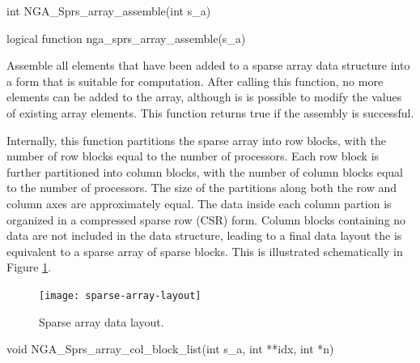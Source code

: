 \documentclass[12pt]{article}
\begin{document}
\begin{capi}
\begin{ccode}
int NGA_Sprs_array_assemble(int s_a)
\end{ccode}
\begin{funcargs}
\end{funcargs}
\end{capi}

\begin{fapi}
\begin{fcode}
logical function nga_sprs_array_assemble(s_a)
\end{fcode}
\end{fapi}

\gcoll

\begin{desc}
Assemble all elements that have been added to a sparse array data structure into
a form that is suitable for computation. After calling this function, no more
elements can be added to the array, although is is possible to modify the values
of existing array elements.  This function returns true if the assembly is
successful.

Internally, this function partitions the sparse array into row blocks, with the
number of row blocks equal to the number of processors. Each row block is
further partitioned into column blocks, with the number of column blocks
equal to the number of processors. The size of the partitions along both the row
and column axes are approximately equal. The data inside each column partion is
organized in a compressed sparse row (CSR) form. Column blocks containing no
data are not included in the data structure, leading to a final data layout the
is equivalent to a sparse array of sparse blocks. This is illustrated
schematically in Figure \ref{sparsearray}.

\begin{figure}
\centering
\texttt{[image: sparse-array-layout]}
\caption{Sparse array data layout.}
\label{sparsearray}
\end{figure}

\end{desc}



\begin{capi}
\begin{ccode}
void NGA_Sprs_array_col_block_list(int s_a, int **idx, int *n)
\end{ccode}
\begin{funcargs}
\end{funcargs}
\end{capi}
\end{document}
